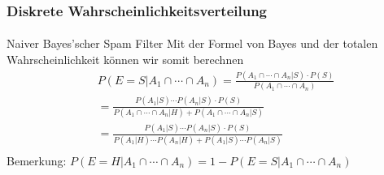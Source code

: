 \documentclass{beamer}
\begin{document}
\begin{frame}
    \frametitle{Diskrete Wahrscheinlichkeitsverteilung}
\framesubtitle{}

\begin{block}{Naiver Bayes'scher Spam Filter}
Mit der Formel von Bayes und der totalen Wahrscheinlichkeit  können wir somit berechnen
\begin{align*}
& P(E=S |  A_1 \cap \cdots \cap A_n) = \frac{P(A_1 \cap \cdots \cap A_n | S) \cdot P(S)}{P(A_1 \cap \cdots \cap A_n)} \\
&=  \frac{P(A_1 | S) \cdots P(A_n | S) \cdot P(S)}{P(A_1 \cap \cdots \cap A_n | H) + P(A_1 \cap \cdots \cap A_n | S)} \\
&=  \frac{P(A_1 | S) \cdots P(A_n | S) \cdot P(S)}{P(A_1 | H) \cdots P(A_n | H)  + P(A_1 | S) \cdots P(A_n | S) } \\
\end{align*}
Bemerkung: $P(E=H |  A_1 \cap \cdots \cap A_n) = 1- P(E=S |  A_1 \cap \cdots \cap A_n) $
\end{block}



 \end{frame}
\end{document}
